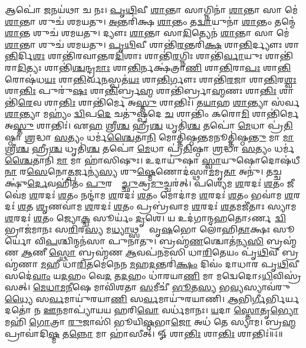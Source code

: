 𑌆𑌪𑍋॑ \ul{𑌜}𑌨𑌯॑𑌥𑌾 𑌚 𑌨𑌃। \ul{𑌪𑍃}\ul{𑌥𑌿}𑌵𑍀 \ul{𑌶𑌾}𑌨𑍍𑌤𑌾 𑌸𑌾𑌗𑍍𑌨𑌿𑌨𑌾॑ \ul{𑌶𑌾}𑌨𑍍𑌤𑌾 𑌸𑌾 𑌮𑍇॑ \ul{𑌶𑌾}𑌨𑍍𑌤𑌾 𑌶𑍁𑌚॑ 𑌶𑌮𑌯𑌤𑍁। \ul{𑌅}𑌨𑍍𑌤𑌰𑌿॑𑌕𑍍𑌷 \ul{𑌶𑌾}𑌨𑍍𑌤𑌂 𑌤\ul{𑌦𑍍𑌵𑌾}𑌯𑍁𑌨𑌾॑ \ul{𑌶𑌾}𑌨𑍍𑌤𑌂 𑌤𑌨𑍍𑌮𑍇॑ \ul{𑌶𑌾}𑌨𑍍𑌤 𑌶𑍁𑌚॑ 𑌶𑌮𑌯𑌤𑍁। 𑌦𑍍𑌯𑍗𑌃  \ul{𑌶𑌾}𑌨𑍍𑌤𑌾 𑌸𑌾\ul{𑌦𑌿}𑌤𑍍𑌯𑍇𑌨॑ \ul{𑌶𑌾}𑌨𑍍𑌤𑌾 𑌸𑌾 𑌮𑍇॑ \ul{𑌶𑌾}𑌨𑍍𑌤𑌾 𑌶𑍁𑌚॑ 𑌶𑌮𑌯𑌤𑍁। \ul{𑌪𑍃}\ul{𑌥𑌿}𑌵𑍀 𑌶𑌾𑌨𑍍𑌤𑌿॑\ul{𑌰}𑌨𑍍𑌤𑌰𑌿॑\ul{𑌕𑍍𑌷}\ul{} 𑌶𑌾\ul{𑌨𑍍𑌤𑌿}𑌰𑍍𑌦𑍍𑌯𑍗𑌃  𑌶𑌾\ul{𑌨𑍍𑌤𑌿}𑌰𑍍𑌦𑌿\ul{𑌶𑌃} 𑌶𑌾𑌨𑍍𑌤𑌿॑𑌰𑌵𑌾𑌨𑍍𑌤𑌰\ul{𑌦𑌿}𑌶𑌾𑌃  𑌶𑌾𑌨𑍍𑌤𑌿॑\ul{𑌰}𑌗𑍍𑌨𑌿𑌃  𑌶𑌾𑌨𑍍𑌤𑌿॑\ul{𑌰𑍍𑌵𑌾}𑌯𑍁𑌃  𑌶𑌾𑌨𑍍𑌤𑌿॑𑌰𑌾\ul{𑌦𑌿}𑌤𑍍𑌯𑌃  𑌶𑌾𑌨𑍍𑌤𑌿॑\ul{𑌶𑍍𑌚}𑌨𑍍𑌦𑍍𑌰\ul{𑌮𑌾𑌃} 𑌶𑌾\ul{𑌨𑍍𑌤𑌿}𑌰𑍍𑌨𑌕𑍍𑌷॑𑌤𑍍𑌰𑌾\ul{𑌣𑌿} 𑌶𑌾\ul{𑌨𑍍𑌤𑌿}𑌰𑌾\ul{𑌪𑌃} 𑌶𑌾\ul{𑌨𑍍𑌤𑌿}𑌰𑍋𑌷॑𑌧\ul{𑌯𑌃} 𑌶𑌾\ul{𑌨𑍍𑌤𑌿}𑌰𑍍𑌵\ul{𑌨}𑌸𑍍𑌪𑌤॑\ul{𑌯𑌃} 𑌶𑌾\ul{𑌨𑍍𑌤𑌿}𑌰𑍍𑌗𑍗𑌃  𑌶𑌾𑌨𑍍𑌤𑌿॑\ul{𑌰}𑌜𑌾 𑌶𑌾\ul{𑌨𑍍𑌤𑌿}𑌰\ul{𑌶𑍍𑌵𑌃} 𑌶𑌾\ul{𑌨𑍍𑌤𑌿𑌃} 𑌪𑍁𑌰𑍁॑\ul{𑌷𑌃} 𑌶𑌾\ul{𑌨𑍍𑌤𑌿}𑌰𑍍𑌬𑍍𑌰\ul{𑌹𑍍𑌮} 𑌶𑌾𑌨𑍍𑌤𑌿॑𑌰𑍍𑌬𑍍𑌰𑌾\ul{𑌹𑍍𑌮}𑌣𑌃  𑌶𑌾\ul{𑌨𑍍𑌤𑌿𑌃} 𑌶𑌾𑌨𑍍𑌤𑌿॑\ul{𑌰𑍇}𑌵 𑌶𑌾\ul{𑌨𑍍𑌤𑌿𑌃} 𑌶𑌾𑌨𑍍𑌤𑌿॑𑌰𑍍𑌮𑍇 𑌅\ul{𑌸𑍍𑌤𑍁} 𑌶𑌾𑌨𑍍𑌤𑌿𑌃॑। 𑌤\ul{𑌯𑌾}𑌹 \ul{𑌶𑌾}𑌨𑍍𑌤𑍍𑌯𑌾 𑌸॑𑌰𑍍𑌵\ul{𑌶𑌾}𑌨𑍍𑌤𑍍𑌯𑌾 𑌮𑌹𑍍𑌯𑌂॑ \ul{𑌦𑍍𑌵𑌿}𑌪\ul{𑌦𑍇} 𑌚𑌤𑍁॑𑌷𑍍𑌪𑌦𑍇 \ul{𑌚} 𑌶𑌾𑌨𑍍𑌤𑌿𑌂॑ 𑌕𑌰𑍋\ul{𑌮𑌿} 𑌶𑌾𑌨𑍍𑌤𑌿॑𑌰𑍍𑌮𑍇 𑌅\ul{𑌸𑍍𑌤𑍁} 𑌶𑌾𑌨𑍍𑌤𑌿𑌃॑। 𑌏\ul{𑌹} 𑌶𑍍𑌰𑍀\ul{𑌶𑍍𑌚} 𑌹𑍍𑌰𑍀\ul{𑌶𑍍𑌚} 𑌧𑍃𑌤𑌿॑\ul{𑌶𑍍𑌚} 𑌤𑌪𑍋॑ \ul{𑌮𑍇}𑌧𑌾 𑌪𑍍𑌰॑\ul{𑌤𑌿}𑌷𑍍𑌠𑌾 \ul{𑌶𑍍𑌰}𑌦𑍍𑌧𑌾 \ul{𑌸}𑌤𑍍𑌯𑌂 𑌧𑌰𑍍𑌮॑\ul{𑌶𑍍𑌚𑍈}𑌤𑌾\ul{𑌨𑌿} 𑌮𑍋𑌤𑍍𑌤𑌿॑𑌷𑍍𑌠\ul{𑌨𑍍𑌤}𑌮𑌨𑍂𑌤𑍍𑌤𑌿॑𑌷𑍍𑌠\ul{𑌨𑍍𑌤𑍁} 𑌮𑌾 \ul{𑌮𑌾}\ul{} 𑌶𑍍𑌰𑍀\ul{𑌶𑍍𑌚} 𑌹𑍍𑌰𑍀\ul{𑌶𑍍𑌚} 𑌧𑍃𑌤𑌿॑\ul{𑌶𑍍𑌚} 𑌤𑌪𑍋॑ \ul{𑌮𑍇}𑌧𑌾 𑌪𑍍𑌰॑\ul{𑌤𑌿}𑌷𑍍𑌠𑌾 \ul{𑌶𑍍𑌰}𑌦𑍍𑌧𑌾 \ul{𑌸}𑌤𑍍𑌯𑌂 𑌧𑌰𑍍𑌮॑\ul{𑌶𑍍𑌚𑍈}𑌤𑌾𑌨𑌿॑ \ul{𑌮𑌾} 𑌮𑌾 𑌹𑌾॑𑌸𑌿𑌷𑍁𑌃। 𑌉𑌦𑌾𑌯𑍁॑𑌷𑌾 \ul{𑌸𑍍𑌵𑌾}𑌯𑍁𑌷𑍋𑌦𑍋𑌷॑𑌧𑍀\ul{𑌨𑌾}\ul{} 𑌰\ul{𑌸𑍇}𑌨𑍋\ul{𑌤𑍍𑌪}𑌰𑍍𑌜𑌨𑍍𑌯॑\ul{𑌸𑍍𑌯} 𑌶𑍁\ul{𑌷𑍍𑌮𑍇}𑌣𑍋𑌦॑𑌸𑍍𑌥𑌾\ul{𑌮}𑌮𑍃\ul{𑌤𑌾}\ul{} 𑌅𑌨𑍁॑। 𑌤𑌚𑍍𑌚𑌕𑍍𑌷𑍁॑\ul{𑌰𑍍𑌦𑍇}𑌵𑌹𑌿॑𑌤𑌂 \ul{𑌪𑍁}𑌰𑌸𑍍𑌤𑌾᳚\ul{𑌚𑍍𑌛𑍁}𑌕𑍍𑌰\ul{𑌮𑍁}𑌚𑍍𑌚𑌰॑𑌤𑍍। 𑌪𑌶𑍍𑌯𑍇॑𑌮 \ul{𑌶}𑌰𑌦𑌃॑ \ul{𑌶}𑌤𑌂 𑌜𑍀𑌵𑍇॑𑌮 \ul{𑌶}𑌰𑌦𑌃॑ \ul{𑌶}𑌤𑌂 𑌨𑌨𑍍𑌦𑌾॑𑌮 \ul{𑌶}𑌰𑌦𑌃॑ \ul{𑌶}𑌤𑌂 𑌮𑍋𑌦𑌾॑𑌮 \ul{𑌶}𑌰𑌦𑌃॑ \ul{𑌶}𑌤𑌂 𑌭𑌵𑌾॑𑌮 \ul{𑌶}𑌰𑌦𑌃॑ \ul{𑌶}𑌤 \ul{𑌶𑍃}𑌣𑌵𑌾॑𑌮 \ul{𑌶}𑌰𑌦𑌃॑ \ul{𑌶}𑌤𑌂 𑌪𑍍𑌰𑌬𑍍𑌰॑𑌵𑌾𑌮 \ul{𑌶}𑌰𑌦𑌃॑ \ul{𑌶}𑌤𑌮𑌜𑍀॑𑌤𑌾𑌃 𑌸𑍍𑌯𑌾𑌮 \ul{𑌶}𑌰𑌦𑌃॑ \ul{𑌶}𑌤𑌂 𑌜𑍍𑌯𑍋\ul{𑌕𑍍𑌚} 𑌸𑍂𑌰𑍍𑌯𑌂॑ \ul{𑌦𑍃}𑌶𑍇। 𑌯 𑌉𑌦॑𑌗𑌾𑌨𑍍𑌮\ul{𑌹}𑌤𑍋𑌽𑌰𑍍𑌣𑌵𑌾᳚\ul{𑌦𑍍𑌵𑌿}𑌭𑍍𑌰𑌾𑌜॑𑌮𑌾𑌨𑌃 𑌸\ul{𑌰𑌿}𑌰\ul{𑌸𑍍𑌯} 𑌮\ul{𑌧𑍍𑌯𑌾}𑌥𑍍𑌸 𑌮𑌾᳚ 𑌵𑍃\ul{𑌷}𑌭𑍋 𑌲𑍋॑𑌹𑌿\ul{𑌤𑌾}𑌕𑍍𑌷𑌃 𑌸𑍂𑌰𑍍𑌯𑍋॑ 𑌵𑌿\ul{𑌪}𑌶𑍍𑌚𑌿𑌨𑍍𑌮𑌨॑𑌸𑌾 𑌪𑍁𑌨𑌾𑌤𑍁। 𑌬𑍍𑌰𑌹𑍍𑌮॑\ul{𑌣}𑌶𑍍𑌚𑍋𑌤॑𑌨𑍍𑌯\ul{𑌸𑌿} 𑌬𑍍𑌰𑌹𑍍𑌮॑𑌣 \ul{𑌆}𑌣𑍀 \ul{𑌸𑍍𑌥𑍋} 𑌬𑍍𑌰𑌹𑍍𑌮॑𑌣 \ul{𑌆}𑌵𑌪॑𑌨𑌮𑌸𑌿 𑌧𑌾\ul{𑌰𑌿}𑌤𑍇𑌯𑌂 𑌪𑍃॑\ul{𑌥𑌿}𑌵𑍀 𑌬𑍍𑌰𑌹𑍍𑌮॑𑌣𑌾 \ul{𑌮}𑌹𑍀 𑌧𑌾॑\ul{𑌰𑌿}𑌤𑌮𑍇॑𑌨𑍇𑌨 \ul{𑌮}𑌹\ul{𑌦}𑌨𑍍𑌤𑌰𑌿॑\ul{𑌕𑍍𑌷𑌂} 𑌦𑌿𑌵𑌂॑ 𑌦𑌾𑌧𑌾𑌰 𑌪𑍃\ul{𑌥𑌿}𑌵𑍀 𑌸𑌦𑍇॑\ul{𑌵𑌾𑌂} 𑌯\ul{𑌦}𑌹𑌂 𑌵𑍇\ul{𑌦} 𑌤\ul{𑌦}𑌹𑌂 𑌧𑌾॑𑌰𑌯𑌾\ul{𑌣𑌿} 𑌮𑌾 𑌮𑌦𑍍𑌵𑍇𑌦𑍋𑌽\ul{𑌧𑌿}𑌵𑌿𑌸𑍍𑌰॑𑌸𑌤𑍍। \ul{𑌮𑍇}\ul{𑌧𑌾}\ul{𑌮}\ul{𑌨𑍀}𑌷𑍇 𑌮𑌾𑌵𑌿॑𑌶𑌤𑌾 \ul{𑌸}𑌮𑍀𑌚𑍀॑ \ul{𑌭𑍂}𑌤\ul{𑌸𑍍𑌯} 𑌭\ul{𑌵𑍍𑌯}𑌸𑍍𑌯𑌾𑌵॑𑌰𑍁\ul{𑌧𑍍𑌯𑍈} 𑌸\ul{𑌰𑍍𑌵}𑌮𑌾𑌯𑍁॑𑌰𑌯𑌾\ul{𑌣𑌿} 𑌸\ul{𑌰𑍍𑌵}𑌮𑌾𑌯𑍁॑𑌰𑌯𑌾𑌣𑌿। \ul{𑌆}𑌭𑌿\ul{𑌰𑍍𑌗𑍀}𑌰𑍍𑌭𑌿𑌰𑍍𑌯𑌦𑌤𑍋॑ 𑌨 \ul{𑌊}𑌨𑌮𑌾𑌪𑍍𑌯𑌾॑𑌯𑌯 𑌹𑌰𑌿\ul{𑌵𑍋} 𑌵𑌰𑍍𑌧॑𑌮𑌾𑌨𑌃। \ul{𑌯}𑌦𑌾 \ul{𑌸𑍍𑌤𑍋}𑌤𑍃\ul{𑌭𑍍𑌯𑍋} 𑌮𑌹𑌿॑ \ul{𑌗𑍋}𑌤𑍍𑌰𑌾 \ul{𑌰𑍁}𑌜𑌾𑌸𑌿॑ 𑌭𑍂𑌯𑌿\ul{𑌷𑍍𑌠}𑌭𑌾\ul{𑌜𑍋} 𑌅𑌧॑ 𑌤𑍇 𑌸𑍍𑌯𑌾𑌮। 𑌬𑍍𑌰\ul{𑌹𑍍𑌮} 𑌪𑍍𑌰𑌾𑌵𑌾॑𑌦𑌿\ul{𑌷𑍍𑌮} 𑌤\ul{𑌨𑍍𑌨𑍋} 𑌮𑌾 𑌹𑌾॑𑌸𑍀𑌤𑍍। 𑍐 𑌶𑌾\ul{𑌨𑍍𑌤𑌿𑌃} 𑌶𑌾\ul{𑌨𑍍𑌤𑌿𑌃} 𑌶𑌾𑌨𑍍𑌤𑌿𑌃॑॥4॥

